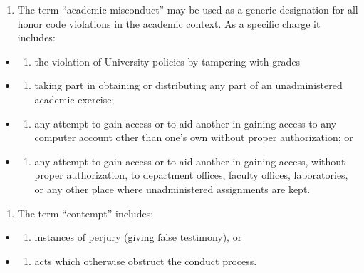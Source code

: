 \documentclass[
]{book}
\providecommand{\tightlist}{%
  \setlength{\itemsep}{0pt}\setlength{\parskip}{0pt}}
\begin{document}
\begin{enumerate}
\def\labelenumi{\arabic{enumi}.}
\setcounter{enumi}{4}
\tightlist
\item
  The term ``academic misconduct'' may be used as a generic designation for all honor code violations in the academic context. As a specific charge it includes:
\end{enumerate}

\begin{itemize}
\tightlist
\item
  \begin{enumerate}
  \def\labelenumi{(\alph{enumi})}
  \tightlist
  \item
    the violation of University policies by tampering with grades
  \end{enumerate}
\item
  \begin{enumerate}
  \def\labelenumi{(\alph{enumi})}
  \setcounter{enumi}{1}
  \tightlist
  \item
    taking part in obtaining or distributing any part of an unadministered academic exercise;
  \end{enumerate}
\item
  \begin{enumerate}
  \def\labelenumi{(\alph{enumi})}
  \setcounter{enumi}{2}
  \tightlist
  \item
    any attempt to gain access or to aid another in gaining access to any computer account other than one's own without proper authorization; or
  \end{enumerate}
\item
  \begin{enumerate}
  \def\labelenumi{(\alph{enumi})}
  \setcounter{enumi}{3}
  \tightlist
  \item
    any attempt to gain access or to aid another in gaining access, without proper authorization, to department offices, faculty offices, laboratories, or any other place where unadministered assignments are kept.
  \end{enumerate}
\end{itemize}

\begin{enumerate}
\def\labelenumi{\arabic{enumi}.}
\setcounter{enumi}{5}
\tightlist
\item
  The term ``contempt'' includes:
\end{enumerate}

\begin{itemize}
\tightlist
\item
  \begin{enumerate}
  \def\labelenumi{(\alph{enumi})}
  \tightlist
  \item
    instances of perjury (giving false testimony), or
  \end{enumerate}
\item
  \begin{enumerate}
  \def\labelenumi{(\alph{enumi})}
  \setcounter{enumi}{1}
  \tightlist
  \item
    acts which otherwise obstruct the conduct process.
  \end{enumerate}
\end{itemize}
\end{document}
